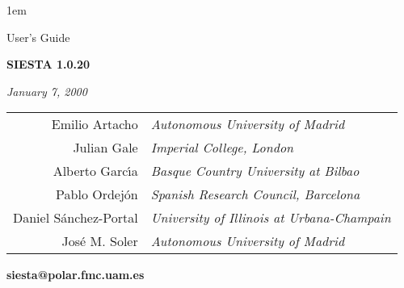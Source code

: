 

\textheight 22cm
\textwidth 16cm
\oddsidemargin 1mm
\topmargin -15mm


\makeindex

\baselineskip=14pt
\parskip 5pt
\parindent 1em




\begin{titlepage}

\begin{center}

\vspace{1cm}

{\huge {\sc User's Guide}}

\vspace{3cm}

{\Huge {\bf SIESTA 1.0.20}}

\vspace{3cm}

{\Large {\it January 7, 2000} }

\vspace{3cm}

\begin{tabular}{rl}

{\Large Emilio Artacho} &
   \Large{\it Autonomous University of Madrid} \\

{\Large Julian Gale} &
   \Large{\it Imperial College, London} \\

{\Large Alberto Garc\'{\i}a} &
   \Large{\it Basque Country University at Bilbao} \\

{\Large Pablo Ordej\'on} & 
   \Large{\it Spanish Research Council, Barcelona} \\

{\Large Daniel S\'anchez-Portal} &
   \Large{\it University of Illinois at Urbana-Champain} \\

{\Large Jos\'e M. Soler} &
   \Large{\it Autonomous University of Madrid}

\end{tabular}

\vspace{2cm}
{\bf siesta@polar.fmc.uam.es}

\end{center}

\end{titlepage}

